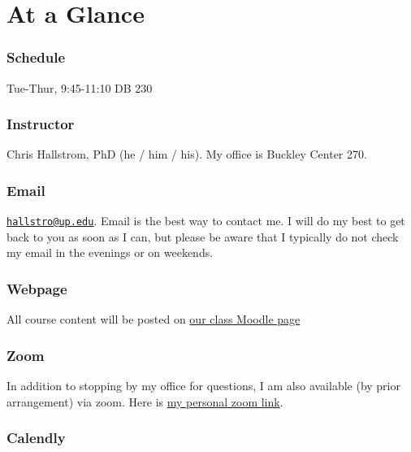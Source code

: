 \documentclass[
  letterpaper,
  DIV=11,
  numbers=noendperiod]{scrreprt}
\begin{document}

\chapter{At a Glance}\label{at-a-glance}

\subsection*{Schedule}\label{schedule}

Tue-Thur, 9:45-11:10 DB 230

\subsection*{Instructor}\label{instructor}

Chris Hallstrom, PhD (he / him / his). My office is Buckley Center 270.

\subsection*{Email}\label{email}

\href{mailto:hallstro@up.edu}{\nolinkurl{hallstro@up.edu}}. Email is the
best way to contact me. I will do my best to get back to you as soon as
I can, but please be aware that I typically do not check my email in the
evenings or on weekends.

\subsection*{Webpage}\label{webpage}

All course content will be posted on \href{https://learning.up.edu}{our
class Moodle page}

\subsection*{Zoom}\label{zoom}

In addition to stopping by my office for questions, I am also available
(by prior arrangement) via zoom. Here is
\href{https://uportland.zoom.us/j/4098263199}{my personal zoom link}.

\subsection*{Calendly}\label{calendly}
\end{document}
